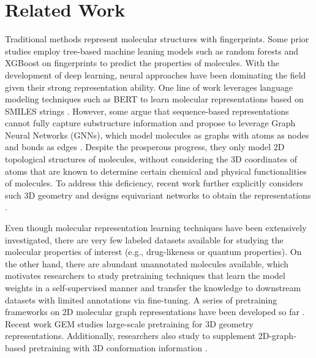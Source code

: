 \section{Related Work}
\label{sec:recent-work}

Traditional methods \cite{Carhart:1985ap,Nilakantan:1987tt,Rogers:2010fp} represent molecular structures with fingerprints. Some prior studies \cite{Svetnik:2004ab,Meyer:2019ld,Wu:2018dv} employ tree-based machine leaning models such as random forests \cite{Breiman:2001rf} and XGBoost \cite{Chen:2016ga} on fingerprints to predict the properties of molecules.
With the development of deep learning, neural approaches have been dominating the field given their strong representation ability.
One line of work \cite{Wang:2019hp,Chithrananda:2020eo} leverages language modeling techniques such as BERT \cite{Devlin:2019uk} to learn molecular representations based on SMILES strings \cite{Weininger:1988sm}.
However, some argue that sequence-based representations cannot fully capture substructure information and propose to leverage Graph Neural Networks (GNNs), which model molecules as graphs with atoms as nodes and bonds as edges \cite{Gilmer:2017tl,Liu:2019uy,Ying:2021ug}.
Despite the prosperous progress, they only model 2D topological structures of molecules, without considering the 3D coordinates of atoms that are known to determine certain chemical and physical functionalities of molecules.
To address this deficiency, recent work further explicitly considers such 3D geometry and designs equivariant networks to obtain the representations \cite{Schutt:2017wh,Klicpera:2020vw,Satorras:2021tz,Fuchs:2020wj,Schutt:2021vm,Du:2021ci,Liu:2021hq,Gasteiger:2021uf,Batzner:2021to,Brandstetter:2022wl,Xu:2021uj}.

Even though molecular representation learning techniques have been extensively investigated, there are very few labeled datasets available for studying the molecular properties of interest (e.g., drug-likeness or quantum properties).
On the other hand, there are abundant unannotated molecules available, which motivates researchers to study pretraining techniques that learn the model weights in a self-supervised manner and transfer the knowledge to downstream datasets with limited annotations via fine-tuning.
A series of pretraining frameworks on 2D molecular graph representations have been developed so far \cite{Rong:2020vk,Hu:2020uz,Zhang:2021wj,Wang:2022gr,Li:2020fo,Xia:2022jw}.
Recent work GEM \cite{Fang:2022et} studies large-scale pretraining for 3D geometry representations.
Additionally, researchers also study to supplement 2D-graph-based pretraining with 3D conformation information \cite{Yang:2021wg,Liu:2022vr,Stark:2021ug}.

